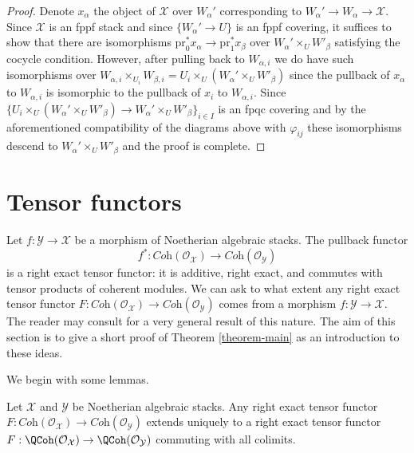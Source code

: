 \begin{proof}
\medskip\noindent
Denote $x_\alpha$ the object of $\mathcal{X}$ over $W_\alpha'$
corresponding to $W_\alpha' \to W_\alpha \to \mathcal{X}$.
Since $\mathcal{X}$ is an fppf stack and since
$\{W_\alpha' \to U\}$ is an fppf covering, it suffices
to show that there are isomorphisms
$\text{pr}_0^*x_\alpha \to \text{pr}_1^*x_\beta$
over $W_\alpha' \times_U W'_\beta$ satisfying the
cocycle condition. However, after pulling back to
$W_{\alpha, i}$ we do have such isomorphisms over
$W_{\alpha, i} \times_{U_i} W_{\beta, i} =
U_i \times_U (W_\alpha' \times_U W'_\beta)$
since the pullback of $x_\alpha$ to $W_{\alpha, i}$
is isomorphic to the pullback of $x_i$ to $W_{\alpha, i}$.
Since $\{U_i \times_U (W_\alpha' \times_U W'_\beta) \to
W_\alpha' \times_U W'_\beta\}_{i \in I}$
is an fpqc covering and by the aforementioned compatibility
of the diagrams above with $\varphi_{ij}$ these
isomorphisms descend to $W_\alpha' \times_U W'_\beta$
and the proof is complete.
\end{proof}










\section{Tensor functors}
\label{section-tensor-functors}

\noindent
Let $f : \mathcal{Y} \to \mathcal{X}$ be a morphism of Noetherian
algebraic stacks. The pullback functor
$$
f^* :
\textit{Coh}(\mathcal{O}_\mathcal{X})
\longrightarrow
\textit{Coh}(\mathcal{O}_\mathcal{Y})
$$
is a right exact tensor functor: it is additive, right exact,
and commutes with tensor products of coherent modules. We can
ask to what extent any right exact tensor functor
$F : \textit{Coh}(\mathcal{O}_\mathcal{X}) \to
\textit{Coh}(\mathcal{O}_\mathcal{Y})$ comes from a
morphism $f : \mathcal{Y} \to \mathcal{X}$.
The reader may consult
\cite{Hall-Rydh-coherent} for a very general result
of this nature.
The aim of this section is to give a short proof of
Theorem \ref{theorem-main} as an introduction to these ideas.

\medskip\noindent
We begin with some lemmas.

\begin{lemma}
\label{lemma-extend}
Let $\mathcal{X}$ and $\mathcal{Y}$ be Noetherian algebraic stacks.
Any right exact tensor functor $F : \textit{Coh}(\mathcal{O}_\mathcal{X}) \to
\textit{Coh}(\mathcal{O}_\mathcal{Y})$ extends uniquely to a
right exact tensor functor
$F : \QCoh(\mathcal{O}_\mathcal{X}) \to \QCoh(\mathcal{O}_\mathcal{Y})$
commuting with all colimits.
\end{lemma}

